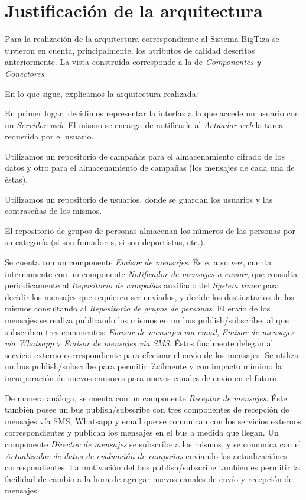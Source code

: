 \documentclass[a4paper, 10pt, twoside]{article}
\begin{document}
\newpage
\section{Justificación de la arquitectura}
Para la realización de la arquitectura correspondiente al Sistema BigTiza se tuvieron en cuenta, principalmente, los atributos de calidad descritos anteriormente. La vista construída corresponde a la de \textit{Componentes y Conectores}.	

En lo que sigue, explicamos la arquitectura realizada:

En primer lugar, decidimos representar la interfaz a la que accede un usuario con un \textit{Servidor web}. El mismo se encarga de notificarle al \textit{Actuador web} la tarea requerida por el usuario.

Utilizamos un repositorio de campañas para el almacenamiento cifrado de los datos y otro para el almacenamiento de campañas (los mensajes de cada una de éstas).

Utilizamos un repositorio de usuarios, donde se guardan los usuarios y las contraseñas de los mismos.

El repositorio de grupos de personas almacenan los números de las personas por su categoría (si son fumadores, si son deportistas, etc.).

Se cuenta con un componente \textit{Emisor de mensajes}. Éste, a su vez, cuenta internamente con un componente \textit{Notificador de mensajes a enviar}, que consulta periódicamente al \textit{Repositorio de campañas} auxiliado del \textit{System timer} para decidir los mensajes que requieren ser enviados, y decide los destinatarios de los mismos consultando al \textit{Repositorio de grupos de personas}. El envío de los mensajes se realiza publicando los mismos en un bus publish/subscribe, al que subscriben tres comonentes: \textit{Emisor de mensajes via email}, \textit{Emisor de mensajes via Whatsapp} y \textit{Emisor de mensajes via SMS}. Éstos finalmente delegan al servicio externo correspondiente para efectuar el envío de los mensajes. Se utiliza un bus publish/subscribe para permitir fácilmente y con impacto mímimo la incorporación de nuevos emisores para nuevos canales de envío en el futuro.

De manera análoga, se cuenta con un componente \textit{Receptor de mensajes}. Éste también posee un bus publish/subscribe con tres componentes de recepción de mensajes vía SMS, Whatsapp y email que se comunican con los servicios externos correspondientes y publican los mensajes en el bus a medida que llegan. Un componente \textit{Director de mensajes} se subscribe a los mismos, y se comunica con el \textit{Actualizador de datos de evaluación de campañas} enviando las actualizaciónes correspondientes. La motivación del bus publish/subscribe también es permitir la facilidad de cambio a la hora de agregar nuevos canales de envío y recepción de mensajes.
\end{document}
